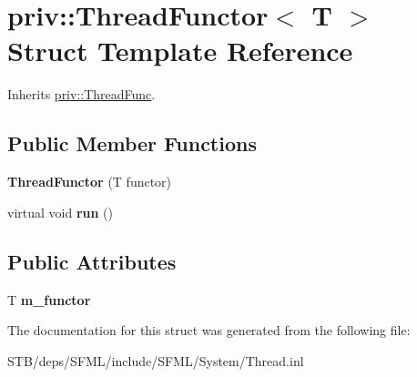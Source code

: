 \hypertarget{structpriv_1_1_thread_functor}{\section{priv\+:\+:Thread\+Functor$<$ T $>$ Struct Template Reference}
\label{structpriv_1_1_thread_functor}
}


Inherits \hyperlink{structpriv_1_1_thread_func}{priv\+::\+Thread\+Func}.

\subsection*{Public Member Functions}
\begin{DoxyCompactItemize}
\item 
\hypertarget{structpriv_1_1_thread_functor_a2df57df5cd6f7396b033512bb0e01848}{{\bfseries Thread\+Functor} (T functor)}\label{structpriv_1_1_thread_functor_a2df57df5cd6f7396b033512bb0e01848}

\item 
\hypertarget{structpriv_1_1_thread_functor_a8bb44b4b46d08d844d070ae3fdb251d7}{virtual void {\bfseries run} ()}\label{structpriv_1_1_thread_functor_a8bb44b4b46d08d844d070ae3fdb251d7}

\end{DoxyCompactItemize}
\subsection*{Public Attributes}
\begin{DoxyCompactItemize}
\item 
\hypertarget{structpriv_1_1_thread_functor_a73254bbde4d3452de1aeda531ca632b2}{T {\bfseries m\+\_\+functor}}\label{structpriv_1_1_thread_functor_a73254bbde4d3452de1aeda531ca632b2}

\end{DoxyCompactItemize}


The documentation for this struct was generated from the following file\+:\begin{DoxyCompactItemize}
\item 
S\+T\+B/deps/\+S\+F\+M\+L/include/\+S\+F\+M\+L/\+System/Thread.\+inl\end{DoxyCompactItemize}
